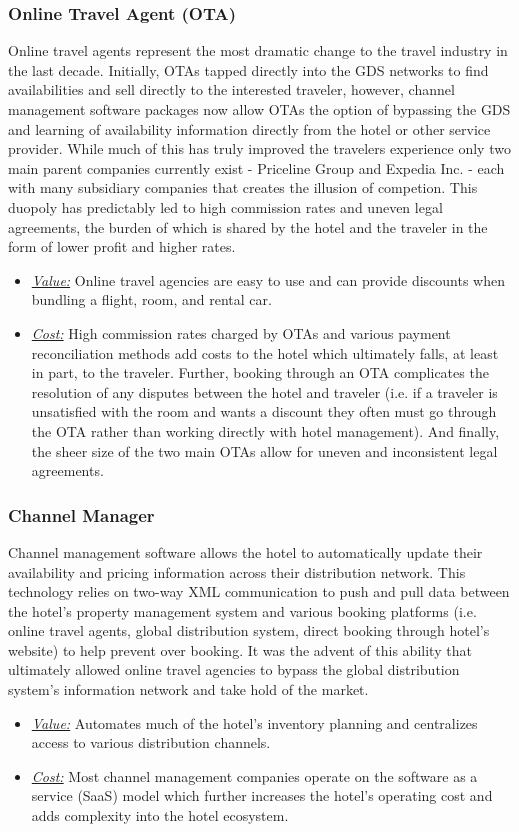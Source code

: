 \documentclass{article}
\begin{document}
\subsubsection{Online Travel Agent (OTA)}
Online travel agents represent the most dramatic change to the travel industry in the last decade. Initially, OTAs tapped directly into the GDS networks to find availabilities and sell directly to the interested traveler, however, channel management software packages now allow OTAs the option of bypassing the GDS and learning of availability information directly from the hotel or other service provider. While much of this has truly improved the travelers experience only two main parent companies currently exist - Priceline Group and Expedia Inc. - each with many subsidiary companies that creates the illusion of competion. This duopoly has predictably led to high commission rates and uneven legal agreements, the burden of which is shared by the hotel and the traveler in the form of lower profit and higher rates.
\begin{itemize}
 \item \underline{\textit{Value:}} Online travel agencies are easy to use and can provide discounts when bundling a flight, room, and rental car. 
 \item \underline{\textit{Cost:}} High commission rates charged by OTAs and various payment reconciliation methods add costs to the hotel which ultimately falls, at least in part, to the traveler. Further, booking through an OTA complicates the resolution of any disputes between the hotel and traveler (i.e. if a traveler is unsatisfied with the room and wants a discount they often must go through the OTA rather than working directly with hotel management). And finally, the sheer size of the two main OTAs allow for uneven and inconsistent legal agreements. 
\end{itemize}

\subsubsection{Channel Manager}
Channel management software allows the hotel to automatically update their availability and pricing information across their distribution network. This technology relies on two-way XML communication to push and pull data between the hotel's property management system and various booking platforms (i.e. online travel agents, global distribution system, direct booking through hotel's website) to help prevent over booking. It was the advent of this ability that ultimately allowed online travel agencies to bypass the global distribution system's information network and take hold of the market. 
\begin{itemize}
 \item \underline{\textit{Value:}} Automates much of the hotel's inventory planning and centralizes access to various distribution channels. 
  \item \underline{\textit{Cost:}} Most channel management companies operate on the software as a service (SaaS) model which further increases the hotel's operating cost and adds complexity into the hotel ecosystem. 
  \end{itemize}
\end{document}
